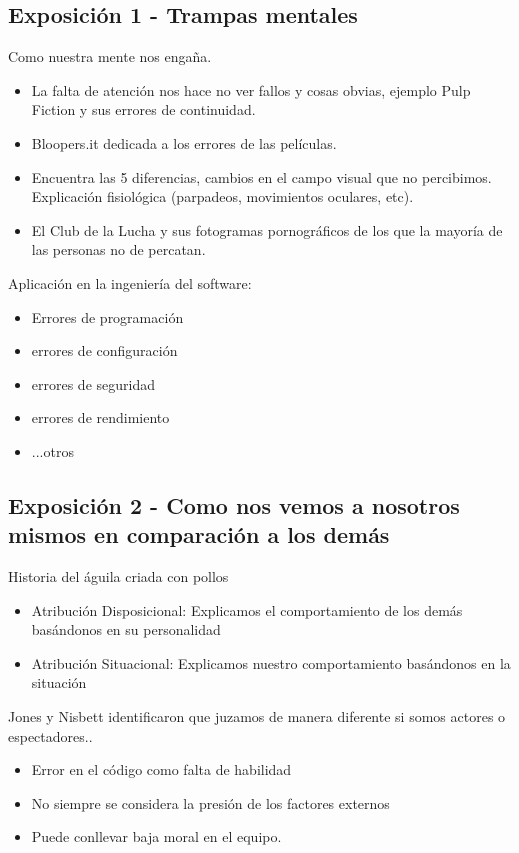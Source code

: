 \documentclass[12pt, a4paper, twoside]{article}
\begin{document}
\subsection{Exposición 1 - Trampas mentales}
Como nuestra mente nos engaña. \\
\begin{itemize}
\item La falta de atención nos hace no ver fallos y cosas obvias, ejemplo Pulp Fiction y sus errores de continuidad. 
\item Bloopers.it dedicada a los errores de las películas. 
\item Encuentra las 5 diferencias, cambios en el campo visual que no percibimos. Explicación fisiológica (parpadeos, movimientos oculares, etc). 
\item El Club de la Lucha y sus fotogramas pornográficos de los que la mayoría de las personas no de percatan.
\end{itemize}
Aplicación en la ingeniería del software:
\begin{itemize}
\item{Errores de programación}
\item {errores de configuración}
\item {errores de seguridad}
\item {errores de rendimiento}
\item {...otros}
\end{itemize}



\subsection{Exposición 2 - Como nos vemos a nosotros mismos en comparación a los demás}
Historia del águila criada con pollos
\begin{itemize}
    \item{Atribución Disposicional: Explicamos el comportamiento de los demás basándonos en su personalidad}
    \item {Atribución Situacional: Explicamos nuestro comportamiento basándonos en la situación}
\end{itemize}
Jones  y Nisbett identificaron que juzamos de manera diferente si somos actores o espectadores..

\begin{itemize}
    \item{Error en el código como falta de habilidad}
    \item{No siempre se considera la presión de los factores externos}
    \item {Puede conllevar baja moral en el equipo.}
\end{itemize}
\end{document}
